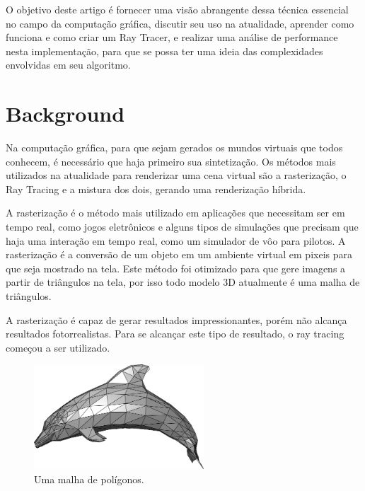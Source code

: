\documentclass[journal]{IEEEtran}
\begin{document}
O objetivo deste artigo é fornecer uma visão abrangente dessa técnica essencial
no campo da computação gráfica, discutir seu uso na atualidade, aprender como
funciona e como criar um Ray Tracer, e realizar uma análise de performance nesta
implementação, para que se possa ter uma ideia das complexidades envolvidas em
seu algoritmo.


\section{Background}

Na computação gráfica, para que sejam gerados os mundos virtuais que todos conhecem,
é necessário que haja primeiro sua sintetização. Os métodos mais utilizados na atualidade
para renderizar uma cena virtual são a rasterização, o Ray Tracing e a mistura dos dois,
gerando uma renderização híbrida.

A rasterização é o método mais utilizado em aplicações que necessitam ser em tempo
real, como jogos eletrônicos e alguns tipos de simulações que precisam que haja
uma interação em tempo real, como um simulador de vôo para pilotos. A rasterização
é a conversão de um objeto em um ambiente virtual em pixeis para que seja mostrado
na tela. Este método foi otimizado para que gere imagens a partir de triângulos na
tela, por isso todo modelo 3D atualmente é uma malha de triângulos.
\cite{c12}

A rasterização é capaz de gerar resultados impressionantes, porém não alcança 
resultados fotorrealistas. Para se alcançar este tipo de resultado, o ray tracing
começou a ser utilizado.

\begin{figure}[!t]
\centering
\includegraphics[width=2.5in]{media/mesh.png}
\caption{Uma malha de polígonos.}
\label{fig_sim}
\end{figure}
\end{document}
